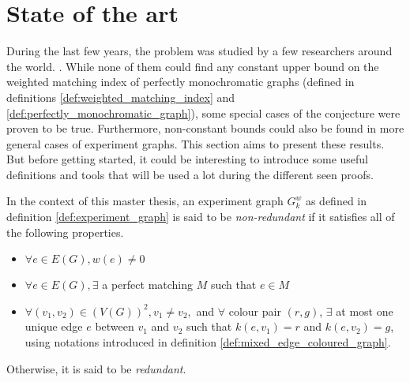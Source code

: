 \chapter{State of the art}

During the last few years, the problem was studied by a few researchers around the world. \cite{Krenn_2017} \cite{bogdanov} \cite{chandran} \cite{chandran2023graphtheoretic}. While none of them could find any constant upper bound on the weighted matching index of perfectly monochromatic graphs (defined in definitions \ref{def:weighted_matching_index} and \ref{def:perfectly_monochromatic_graph}), some special cases of the conjecture were proven to be true. Furthermore, non-constant bounds could also be found in more general cases of experiment graphs. This section aims to present these results. But before getting started, it could be interesting to introduce some useful definitions and tools that will be used a lot during the different seen proofs.

\begin{definition}
    \label{def:redundant_experiment_graph}
    In the context of this master thesis, an experiment graph $G_k^w$ as defined in definition \ref{def:experiment_graph} is said to be \textit{non-redundant} if it satisfies all of the following properties.

    \begin{itemize}
        \item $\forall e \in E(G), w(e) \neq 0$
        \item $\forall e \in E(G), \exists$ a perfect matching $M$ such that $e \in M$
        \item $\forall (v_1, v_2) \in (V(G))^2, v_1 \neq v_2,$ and $\forall$ colour pair $(r, g)$, $\exists$ at most one unique edge $e$ between $v_1$ and $v_2$ such that $k(e, v_1) = r$ and $k(e, v_2) = g$, using notations introduced in definition \ref{def:mixed_edge_coloured_graph}.
    \end{itemize}

    Otherwise, it is said to be \textit{redundant}.
\end{definition}


